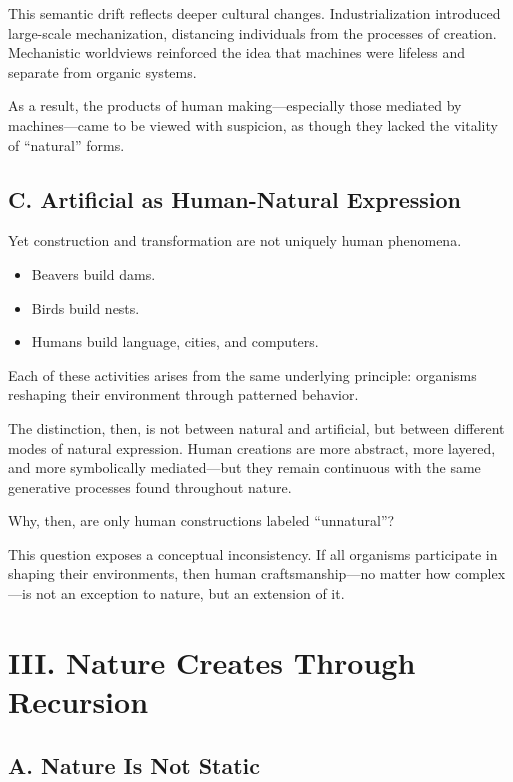 \documentclass[12pt]{article}
\begin{document}
This semantic drift reflects deeper cultural changes. Industrialization introduced large-scale mechanization, distancing individuals from the processes of creation. Mechanistic worldviews reinforced the idea that machines were lifeless and separate from organic systems.

As a result, the products of human making—especially those mediated by machines—came to be viewed with suspicion, as though they lacked the vitality of “natural” forms.

\subsection*{C. Artificial as Human-Natural Expression}

Yet construction and transformation are not uniquely human phenomena.

\begin{itemize}
    \item Beavers build dams.
    \item Birds build nests.
    \item Humans build language, cities, and computers.
\end{itemize}

Each of these activities arises from the same underlying principle: organisms reshaping their environment through patterned behavior.

The distinction, then, is not between natural and artificial, but between different modes of natural expression. Human creations are more abstract, more layered, and more symbolically mediated—but they remain continuous with the same generative processes found throughout nature.

Why, then, are only human constructions labeled “unnatural”?

This question exposes a conceptual inconsistency. If all organisms participate in shaping their environments, then human craftsmanship—no matter how complex—is not an exception to nature, but an extension of it.

\section*{III. Nature Creates Through Recursion}

\subsection*{A. Nature Is Not Static}
\end{document}

